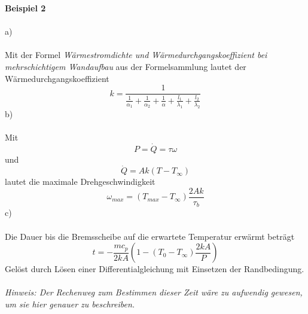 \newpage
\noindent
\textbf{Beispiel 2}\\ \\
a)\\ \\
Mit der Formel \textit{Wärmestromdichte und Wärmedurchgangskoeffizient bei mehrschichtigem Wandaufbau} aus der Formelsammlung lautet der Wärmedurchgangskoeffizient 
\[
	k = \frac{1}{\frac{1}{\alpha_1} + \frac{1}{\alpha_2} + \frac{1}{\alpha} + \frac{l_1}{\lambda_1} + \frac{l_2}{\lambda_2}}
\]
b)\\ \\
Mit 
\[
	P = \dot{Q} = \tau\omega
\]
und
\[
	\dot{Q} = Ak(T - T_\infty)
\]
lautet die maximale Drehgeschwindigkeit
\[
	\omega_{max} = (T_{max} - T_\infty)\frac{2Ak}{\tau_b}
\]
c)\\ \\
Die Dauer bis die Bremsscheibe auf die erwartete Temperatur erwärmt beträgt
\[
	t = -\frac{mc_p}{2kA}\left(1 - (T_0 - T_\infty)\frac{2kA}{P}\right)	
\]
Gelöst durch Lösen einer Differentialgleichung mit Einsetzen der Randbedingung. \\ \\
\textit{Hinweis: Der Rechenweg zum Bestimmen dieser Zeit wäre zu aufwendig gewesen, um sie hier genauer zu beschreiben.} \\ \\